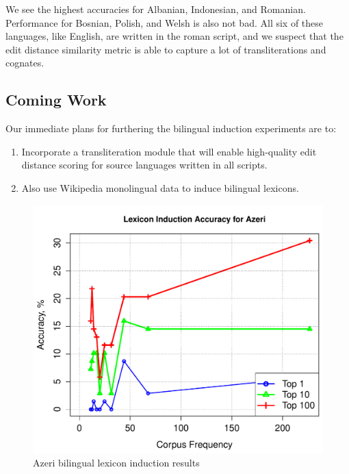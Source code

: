 \documentclass[11pt]{article}
\begin{document}
We see the highest accuracies for Albanian, Indonesian, and Romanian. Performance for Bosnian, Polish, and Welsh is also not bad. All six of these languages, like English, are written in the roman script, and we suspect that the edit distance similarity metric is able to capture a lot of transliterations and cognates. 

\subsection{Coming Work}
Our immediate plans for furthering the bilingual induction experiments are to:
\begin{enumerate}
\item{Incorporate a transliteration module that will enable high-quality edit distance scoring for source languages written in all scripts.}
\item{Also use Wikipedia monolingual data to induce bilingual lexicons.}
\end{enumerate}



\begin{figure}[h]
\begin{center}
\includegraphics[width=0.9 \linewidth]{../byFreqGraphs/az/lexinductnew.pdf}
\vskip -0.15in
\caption{Azeri bilingual lexicon induction results}
\label{fig:bli.az} 
\end{center}
\end{figure}
\end{document}
